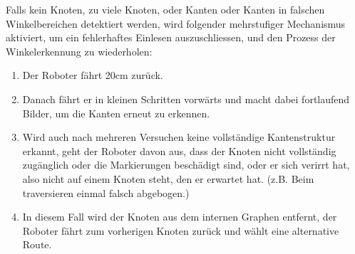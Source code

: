 Falls kein Knoten, zu viele Knoten, oder Kanten oder Kanten in falschen Winkelbereichen detektiert werden, wird folgender mehrstufiger Mechanismus aktiviert, um ein fehlerhaftes Einlesen auszuschliessen, und den Prozess der Winkelerkennung zu wiederholen:
\begin{enumerate}
    \item Der Roboter fährt 20cm zurück.
    \item Danach fährt er in kleinen Schritten vorwärts und macht dabei fortlaufend Bilder, um die Kanten erneut zu erkennen.
    \item Wird auch nach mehreren Versuchen keine vollständige Kantenstruktur erkannt, geht der Roboter davon aus, dass der Knoten nicht vollständig zugänglich oder die Markierungen beschädigt sind, oder er sich verirrt hat, also nicht auf einem Knoten steht, den er erwartet hat. (z.B. Beim traversieren einmal falsch abgebogen.)
    \item In diesem Fall wird der Knoten aus dem internen Graphen entfernt, der Roboter fährt zum vorherigen Knoten zurück und wählt eine alternative Route.
\end{enumerate}
